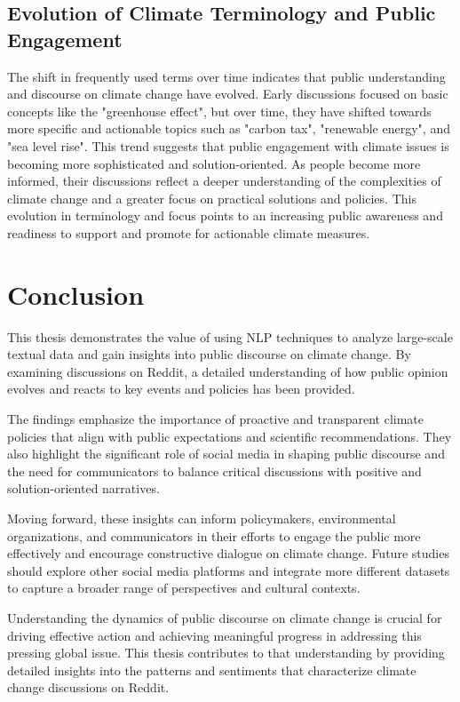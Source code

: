 \subsection{Evolution of Climate Terminology and Public Engagement}
The shift in frequently used terms over time indicates that public understanding and discourse on climate change have evolved. Early discussions focused on basic concepts like the "greenhouse effect", but over time, they have shifted towards more specific and actionable topics such as "carbon tax", "renewable energy", and "sea level rise". This trend suggests that public engagement with climate issues is becoming more sophisticated and solution-oriented. As people become more informed, their discussions reflect a deeper understanding of the complexities of climate change and a greater focus on practical solutions and policies. This evolution in terminology and focus points to an increasing public awareness and readiness to support and promote for actionable climate measures.

\section{Conclusion}
This thesis demonstrates the value of using NLP techniques to analyze large-scale textual data and gain insights into public discourse on climate change. By examining discussions on Reddit, a detailed understanding of how public opinion evolves and reacts to key events and policies has been provided.

The findings emphasize the importance of proactive and transparent climate policies that align with public expectations and scientific recommendations. They also highlight the significant role of social media in shaping public discourse and the need for communicators to balance critical discussions with positive and solution-oriented narratives.

Moving forward, these insights can inform policymakers, environmental organizations, and communicators in their efforts to engage the public more effectively and encourage constructive dialogue on climate change. Future studies should explore other social media platforms and integrate more different datasets to capture a broader range of perspectives and cultural contexts.

Understanding the dynamics of public discourse on climate change is crucial for driving effective action and achieving meaningful progress in addressing this pressing global issue. This thesis contributes to that understanding by providing detailed insights into the patterns and sentiments that characterize climate change discussions on Reddit.